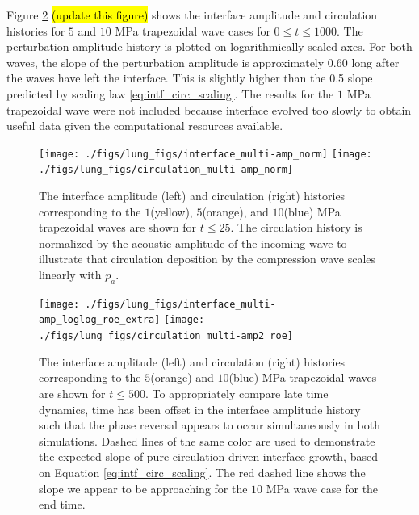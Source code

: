 Figure \ref{fig:trapz_circ_interface_loglog} \hl{(update this figure)}
shows the interface amplitude and circulation histories for $5$ and
$10$ MPa trapezoidal wave cases for $0 \leq t\leq 1000$. The
perturbation amplitude history is plotted on logarithmically-scaled
axes. For both waves, the slope of the perturbation amplitude is
approximately $0.60$ long after the waves have left the
interface. This is slightly higher than the 0.5 slope predicted by
scaling law \eqref{eq:intf_circ_scaling}. The results for the $1$ MPa
trapezoidal wave were not included because interface evolved too
slowly to obtain useful data given the computational resources available.
%
\begin{figure}[h] 
  \centering
  \texttt{[image: ./figs/lung\_figs/interface\_multi-amp\_norm]}
  \texttt{[image: ./figs/lung\_figs/circulation\_multi-amp\_norm]}
  \caption[The interface and circulation dependence on wave amplitude at early time]{The interface amplitude (left) and circulation (right)
    histories corresponding to the $1$(yellow), $5$(orange), and
    $10$(blue) MPa trapezoidal waves are shown for $t\leq 25$. The
    circulation history is normalized by the acoustic amplitude of the
    incoming wave to illustrate that circulation deposition by the
    compression wave scales linearly with $p_a$.}
  \label{fig:trapz_circ_interface_early}
\end{figure}
%
\begin{figure}[h] 
  \centering
  \texttt{[image: ./figs/lung\_figs/interface\_multi-amp\_loglog\_roe\_extra]}
  \texttt{[image: ./figs/lung\_figs/circulation\_multi-amp2\_roe]}
  \caption[The interface and circulation dependence on wave amplitude
  at long time]{The interface amplitude (left) and circulation (right)
    histories corresponding to the $5$(orange) and $10$(blue) MPa
    trapezoidal waves are shown for $t\leq 500$. To appropriately
    compare late time dynamics, time has been offset in the interface
    amplitude history such that the phase reversal appears to occur
    simultaneously in both simulations. Dashed lines of the same color
    are used to demonstrate the expected slope of pure circulation
    driven interface growth, based on Equation
    \eqref{eq:intf_circ_scaling}. The red dashed line shows the slope we
    appear to be approaching for the $10$ MPa wave case for the end time.}
  \label{fig:trapz_circ_interface_loglog}
\end{figure}
%
